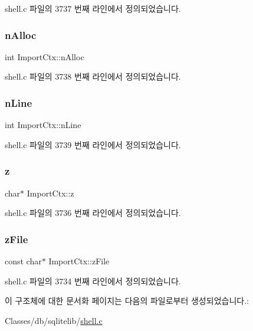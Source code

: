 shell.\+c 파일의 3737 번째 라인에서 정의되었습니다.

\mbox{\label{struct_import_ctx_a04606938856e8071c34af5c68607734b}} 
\subsubsection{\texorpdfstring{n\+Alloc}{nAlloc}}
{\footnotesize\ttfamily int Import\+Ctx\+::n\+Alloc}



shell.\+c 파일의 3738 번째 라인에서 정의되었습니다.

\mbox{\label{struct_import_ctx_a7b910b2b078d291e84ad333792efb000}} 
\subsubsection{\texorpdfstring{n\+Line}{nLine}}
{\footnotesize\ttfamily int Import\+Ctx\+::n\+Line}



shell.\+c 파일의 3739 번째 라인에서 정의되었습니다.

\mbox{\label{struct_import_ctx_ade5d138b0f146f8bed3e83bfbb450f2e}} 
\subsubsection{\texorpdfstring{z}{z}}
{\footnotesize\ttfamily char$\ast$ Import\+Ctx\+::z}



shell.\+c 파일의 3736 번째 라인에서 정의되었습니다.

\mbox{\label{struct_import_ctx_a88414dab6838f62acc8dbb3d2afe299d}} 
\subsubsection{\texorpdfstring{z\+File}{zFile}}
{\footnotesize\ttfamily const char$\ast$ Import\+Ctx\+::z\+File}



shell.\+c 파일의 3734 번째 라인에서 정의되었습니다.



이 구조체에 대한 문서화 페이지는 다음의 파일로부터 생성되었습니다.\+:\begin{DoxyCompactItemize}
\item 
Classes/db/sqlitelib/\hyperlink{shell_8c}{shell.\+c}\end{DoxyCompactItemize}
